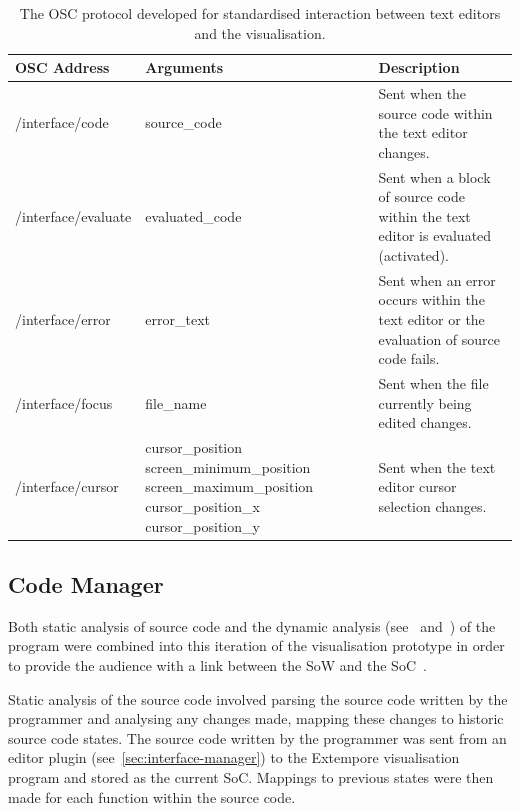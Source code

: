 \begin{table}
  \centering
  \begin{tabular}{|l|p{4.75cm}|p{4.75cm}|}
  \hline
  \textbf{OSC Address} & \textbf{Arguments} & \textbf{Description}\\
  \hline
	/interface/code & source\_code & Sent when the source code within the text editor changes.\\
	\hline
	/interface/evaluate & evaluated\_code & Sent when a block of source code within the text editor is evaluated (activated). \\
	\hline
	/interface/error & error\_text & Sent when an error occurs within the text editor or the evaluation of source code fails.\\
	\hline
	/interface/focus & file\_name & Sent when the file currently being edited changes.\\
	\hline
	/interface/cursor & cursor\_position \newline screen\_minimum\_position \newline screen\_maximum\_position \newline cursor\_position\_x \newline cursor\_position\_y & Sent when the text editor cursor selection changes. \\
  \hline
  \end{tabular}
  \caption{The OSC protocol developed for standardised interaction between text editors and the visualisation.}
  \label{table:osc-protocol}
\end{table}

\subsection{Code Manager}

Both static analysis of source code and the dynamic analysis (see~\cite{Eisenbarth2003} and~\cite{Jerding1997}) of the program were combined into this iteration of the visualisation prototype in order to provide the audience with a link between the \acf{SoW} and the \acf{SoC}~\cite{Swift2013}. \more

Static analysis of the source code involved parsing the source code written by the programmer and analysing any changes made, mapping these changes to historic source code states. The source code written by the programmer was sent from an editor plugin (see~\ref{sec:interface-manager}) to the Extempore visualisation program and stored as the current \ac{SoC}. Mappings to previous states were then made for each function within the source code.


